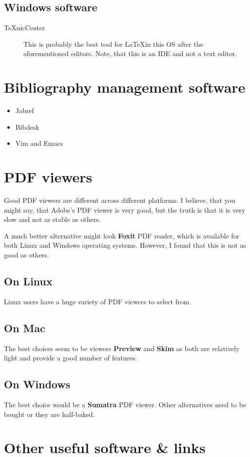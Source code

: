 \documentclass[a4paper]{article}
\begin{document}
\subsection{Windows software}

\begin{description}
    \item[TeXnicCenter] This is probably the best tool for \LaTeX in this OS
        after the aforementioned editors. Note, that this is an IDE and not a
        text editor.
\end{description}

\section{Bibliography management software}

\begin{itemize}
    \item Jabref
    \item Bibdesk
    \item Vim and Emacs
\end{itemize}

\section{PDF viewers}

Good PDF viewers are different across different platforms. I believe, that you
might say, that Adobe's PDF viewer is very good, but the truth is that it is
very slow and not as stable as others.

A much better alternative might look \textbf{Foxit} PDF reader, which is
available for both Linux and Windows operating systems. However, I found that
this is not as good as others.

\subsection{On Linux}

Linux users have a huge variety of PDF viewers to select from. 

\subsection{On Mac}

The best choices seem to be viewers \textbf{Preview} and \textbf{Skim} as both
are relatively light and provide a good number of features.

\subsection{On Windows}

The best choice would be a \textbf{Sumatra} PDF viewer. Other alternatives need
to be bought or they are half-baked.

\section{Other useful software \& links}
\end{document}
